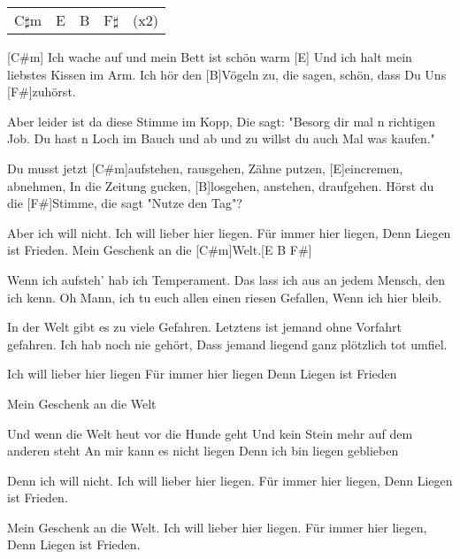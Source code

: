 


\begin{guitar}
	{\footnotesize\begin{tabular}{l|l|l|l l}
			C$\sharp$m & E & B & F$\sharp$ & (x2)
	\end{tabular}}
	
	[C#m] Ich wache auf und mein Bett ist schön warm
	[E] Und ich halt mein liebstes Kissen im Arm.
	Ich hör den [B]Vögeln zu, die sagen, schön, dass Du
	Uns [F#]zuhörst.

	Aber leider ist da diese Stimme im Kopp,
	Die sagt: "Besorg dir mal n richtigen Job.
	Du hast n Loch im Bauch und ab und zu willst du auch
	Mal was kaufen."
	
	Du musst jetzt [C#m]aufstehen, rausgehen,
	Zähne putzen, [E]eincremen, abnehmen,
	In die Zeitung gucken, [B]losgehen, anstehen, draufgehen.
	Hörst du die [F#]Stimme, die sagt "Nutze den Tag"?
	
	Aber ich will nicht.
	Ich will lieber hier liegen.
	Für immer hier liegen,
	Denn Liegen ist Frieden.
	Mein Geschenk an die [C#m]Welt.[E B F#]{}
	
	Wenn ich aufsteh' hab ich Temperament.
	Das lass ich aus an jedem Mensch, den ich kenn.
	Oh Mann, ich tu euch allen einen riesen Gefallen,
	Wenn ich hier bleib.
	
	In der Welt gibt es zu viele Gefahren.
	Letztens ist jemand ohne Vorfahrt gefahren.
	Ich hab noch nie gehört,
	Dass jemand liegend ganz plötzlich tot umfiel.
	
	 
	
	Ich will lieber hier liegen
	Für immer hier liegen
	Denn Liegen ist Frieden
	
	Mein Geschenk an die Welt
	
	Und wenn die Welt heut vor die Hunde geht
	Und kein Stein mehr auf dem anderen steht
	An mir kann es nicht liegen
	Denn ich bin liegen geblieben
	
	Denn ich will nicht.
	Ich will lieber hier liegen.
	Für immer hier liegen,
	Denn Liegen ist Frieden.
	
	Mein Geschenk an die Welt.
	Ich will lieber hier liegen.
	Für immer hier liegen,
	Denn Liegen ist Frieden.
\end{guitar}
